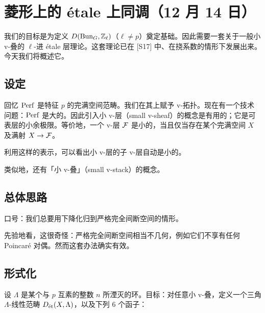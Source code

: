 \section[菱形上的 étale 上同调]{菱形上的 étale 上同调（12 月 14 日）}


我们的目标是为定义 $D(\Bun_G,\Zl)$（$\ell\neq p$）奠定基础。因此需要一套关于一般小 v-叠的 $\ell$-进 étale 层理论。这套理论已在 [S17] 中、在挠系数的情形下发展出来。今天我们将概述它。

\subsection{设定}

回忆 $\Perf$ 是特征 $p$ 的完满空间范畴。我们在其上赋予 v-拓扑。现在有一个技术问题：$\Perf$ 是大的。因此引入小 v-层（small v-sheaf）的概念是有用的；它是可表层的小余极限。等价地，一个 v-层 $\cF$ 是小的，当且仅当存在某个完满空间 $X$ 及满射 $X\to\cF$。

\begin{remark}
利用这样的表示，可以看出小 v-层的子 v-层自动是小的。
\end{remark}

类似地，还有「小 v-叠」（small v-stack）的概念。

\subsection{总体思路}

口号：我们总要用下降化归到严格完全间断空间的情形。

先验地看，这很奇怪：严格完全间断空间相当不几何，例如它们不享有任何 Poincaré 对偶。然而这套办法确实有效。

\subsection{形式化}

设 $\Lambda$ 是某个与 $p$ 互素的整数 $n$ 所湮灭的环。目标：对任意小 v-叠，定义一个三角 $\Lambda$-线性范畴 $D_{\et}(X,\Lambda)$，以及下列 6 个函子：

